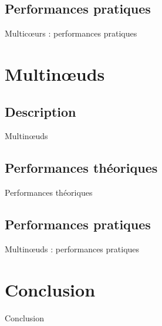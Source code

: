 \documentclass[9.5pt]{beamer}
\begin{document}
	\subsection{Performances pratiques}
		\begin{frame}{Multic\oe{}urs : performances pratiques}

		\end{frame}

\section{Multin\oe{}uds}
	\subsection{Description}
		\begin{frame}{Multin\oe{}uds}

		\end{frame}

	\subsection{Performances théoriques}
		\begin{frame}{Performances théoriques}

		\end{frame}

	\subsection{Performances pratiques}

		\begin{frame}{Multin\oe{}uds : performances pratiques}

		\end{frame}

\section{Conclusion}
	\begin{frame}{Conclusion}

	\end{frame}
\end{document}
